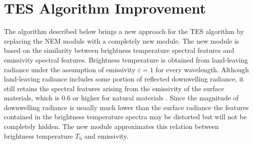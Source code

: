 \section{TES Algorithm Improvement}

The algorithm described below brings a new approach for the TES algorithm by replacing the NEM module with a completely new module. The new module is based on the similarity between brightness temperature spectral features and emissivity spectral features. Brightness temperature is obtained from land-leaving radiance under the assumption of emissivity $\varepsilon=1$ for every wavelength. Although land-leaving radiance includes some portion of reflected downwelling radiance, it still retains the spectral features arising from the emissivity of the surface materials, which is $0.6$ or higher for natural materials \cite{GR98}. Since the magnitude of downwelling radiance is usually much lower than the surface radiance the features contained in the brightness temperature spectra may be distorted but will not be completely hidden. The new module approximates this relation between brightness temperature $T_\mathrm{b}$ and emissivity.

